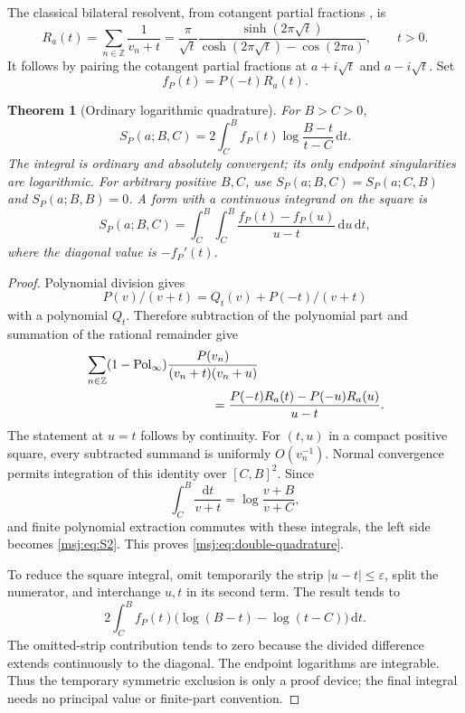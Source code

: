 \documentclass[11pt,a4paper]{article}
\numberwithin{equation}{section}
\theoremstyle{plain}
\newtheorem{theorem}{Theorem}[section]
\theoremstyle{definition}
\theoremstyle{remark}
\begin{document}
The classical bilateral resolvent, from cotangent partial fractions \cite{DLMF}, is
\begin{equation}
 R_a(t)=\sum_{n\in\mathbb Z}\frac1{v_n+t}
       =\frac{\pi}{\sqrt t}
        \frac{\sinh(2\pi\sqrt t)}
             {\cosh(2\pi\sqrt t)-\cos(2\pi a)},\qquad t>0.
 \label{msj:eq:resolvent}
\end{equation}
It follows by pairing the cotangent partial fractions at
$a+i\sqrt t$ and $a-i\sqrt t$. Set
\[
 f_P(t)=P(-t)R_a(t).
\]

\begin{theorem}[Ordinary logarithmic quadrature]
\label{msj:thm:quadrature}
For $B>C>0$,
\begin{equation}
 \boxed{\displaystyle
 S_P(a;B,C)=2\int_C^B f_P(t)
                     \log\frac{B-t}{t-C}\,\mathrm dt.}
 \label{msj:eq:quadrature}
\end{equation}
The integral is ordinary and absolutely convergent; its only endpoint
singularities are logarithmic. For arbitrary positive $B,C$, use
$S_P(a;B,C)=S_P(a;C,B)$ and $S_P(a;B,B)=0$. A form with a continuous
integrand on the square is
\begin{equation}
 S_P(a;B,C)=\int_C^B\int_C^B
      \frac{f_P(t)-f_P(u)}{u-t}\,\mathrm du\,\mathrm dt,
 \label{msj:eq:double-quadrature}
\end{equation}
where the diagonal value is $-f_P'(t)$.
\end{theorem}

\begin{proof}
Polynomial division gives
\[
 P(v)/(v+t)=Q_t(v)+P(-t)/(v+t)
\]
with a polynomial $Q_t$. Therefore subtraction of the polynomial part
and summation of the rational remainder give
\begin{align*}
 &\sum_{n\in\mathbb Z}(1-\operatorname{Pol}_{\infty})
          \frac{P(v_n)}{(v_n+t)(v_n+u)}\\
 &\hspace{35mm}=\frac{P(-t)R_a(t)-P(-u)R_a(u)}{u-t}.
\end{align*}
The statement at $u=t$ follows by continuity. For $(t,u)$ in a compact
positive square, every subtracted summand is uniformly $O(v_n^{-1})$.
Normal convergence permits integration of this identity over $[C,B]^2$.
Since
\[
 \int_C^B\frac{\mathrm dt}{v+t}=\log\frac{v+B}{v+C},
\]
and finite polynomial extraction commutes with these integrals, the
left side becomes \eqref{msj:eq:S2}. This proves
\eqref{msj:eq:double-quadrature}.

To reduce the square integral, omit temporarily the strip
$|u-t|\le\varepsilon$, split the numerator, and interchange $u,t$ in
its second term. The result tends to
\[
 2\int_C^B f_P(t)\bigl(\log(B-t)-\log(t-C)\bigr)\,\mathrm dt.
\]
The omitted-strip contribution tends to zero because the divided
difference extends continuously to the diagonal. The endpoint
logarithms are integrable. Thus the temporary symmetric exclusion is
only a proof device; the final integral needs no principal value or
finite-part convention.
\end{proof}
\end{document}
